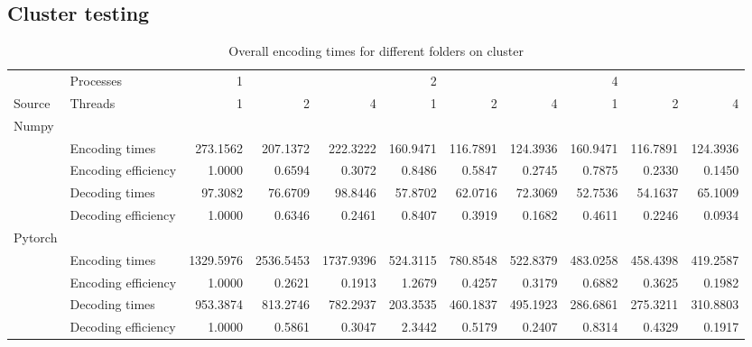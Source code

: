 \subsection{Cluster testing}
\begin{table}[!h]
	\caption{Overall encoding times for different folders on cluster }
	\begin{tabular}{llrrr|rrr|rrr}
		\toprule
		\diagbox{}{} & Processes  &     1 &&&        2&& &        4&& \\
		Source & Threads   & 1 & 2 & 4 & 1 & 2 & 4 & 1 & 2 & 4\\
		\toprule
		Numpy & &  & \\
		\toprule
		& Encoding times &  273.1562 &  207.1372 &  222.3222  &  160.9471 &  116.7891 &  124.3936  &  160.9471 &  116.7891 &  124.3936  \\
		\midrule
		& Encoding efficiency &  1.0000 &  0.6594 &  0.3072 & 0.8486 &  0.5847 &  0.2745 &  0.7875 &  0.2330 &  0.1450\\
		\midrule
		& Decoding times & 97.3082 &  76.6709 &  98.8446 &  57.8702 &  62.0716 &  72.3069 &   52.7536 &  54.1637 &  65.1009 \\
		\midrule
		& Decoding efficiency & 1.0000 &  0.6346 &  0.2461 &  0.8407 &  0.3919 &  0.1682 &  0.4611 &  0.2246 &  0.0934  \\
		\toprule
		Pytorch  & &  & \\
		\toprule
		& Encoding times &   1329.5976 &  2536.5453 &  1737.9396  &   524.3115 &   780.8548 &   522.8379 & 483.0258 &   458.4398 &   419.2587\\
		\midrule
		& Encoding efficiency  &  1.0000 &  0.2621 &  0.1913  &  1.2679 &  0.4257 &  0.3179 &  0.6882 &  0.3625 &  0.1982 \\
		\midrule
		& Decoding times  & 953.3874 &  813.2746 &  782.2937  & 203.3535 &  460.1837 &  495.1923 & 286.6861 &  275.3211 &  310.8803  \\
		\midrule
		& Decoding efficiency& 1.0000 &  0.5861 &  0.3047 &  2.3442 &  0.5179 &  0.2407 &   0.8314 &  0.4329 &  0.1917\\
		\bottomrule
	\end{tabular}
\end{table}
